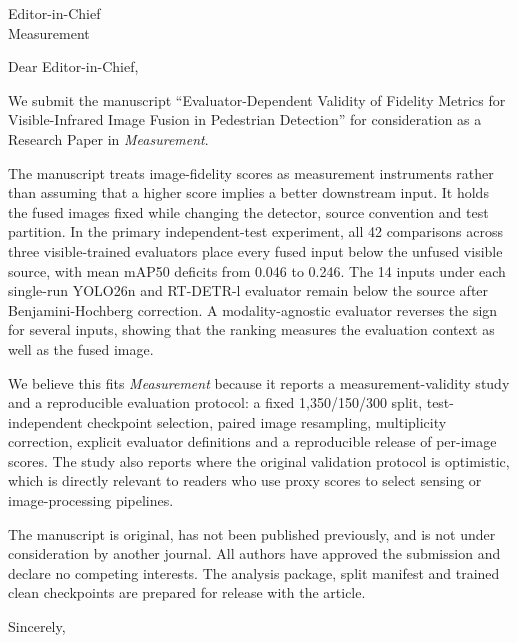 \documentclass[11pt]{letter}
\begin{document}
\begin{letter}{Editor-in-Chief\\Measurement}

\opening{Dear Editor-in-Chief,}

We submit the manuscript ``Evaluator-Dependent Validity of Fidelity Metrics for
Visible-Infrared Image Fusion in Pedestrian Detection'' for consideration as a
Research Paper in \emph{Measurement}.

The manuscript treats image-fidelity scores as measurement instruments rather than
assuming that a higher score implies a better downstream input. It holds the fused
images fixed while changing the detector, source convention and test partition. In the
primary independent-test experiment, all 42 comparisons across three visible-trained
evaluators place every fused input below the unfused visible source, with mean mAP50
deficits from 0.046 to 0.246. The 14 inputs under each single-run YOLO26n and RT-DETR-l
evaluator remain below the source after Benjamini-Hochberg correction. A modality-agnostic
evaluator reverses the sign for several inputs, showing that the ranking measures the
evaluation context as well as the fused image.

We believe this fits \emph{Measurement} because it reports a measurement-validity study
and a reproducible evaluation protocol: a fixed 1,350/150/300 split, test-independent
checkpoint selection, paired image resampling, multiplicity correction, explicit
evaluator definitions and a reproducible release of per-image scores. The study also
reports where the original validation protocol is optimistic, which is directly
relevant to readers who use proxy scores to select sensing or image-processing
pipelines.

The manuscript is original, has not been published previously, and is not under
consideration by another journal. All authors have approved the submission and declare
no competing interests. The analysis package, split manifest and trained clean
checkpoints are prepared for release with the article.

\closing{Sincerely,}

\end{letter}
\end{document}
